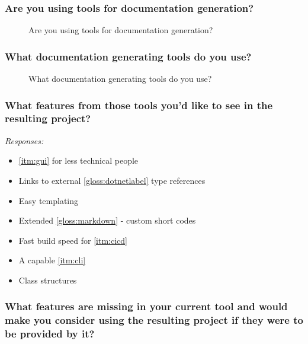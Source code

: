 \subsubsection*{Are you using tools for documentation generation?}

\begin{figure}[H]
    \centering
    \caption{Are you using tools for documentation generation?}
    \label{fig:qUsingToolsForDocGen}
\end{figure}

\subsubsection*{What documentation generating tools do you use?}

\begin{figure}[H]
    \centering
    \caption{What documentation generating tools do you use?}
\end{figure}

\subsubsection*{What features from those tools you'd like to see in the resulting project?}

\textit{Responses:}
\begin{itemize}
    \item \ref{itm:gui} for less technical people
    \item Links to external \ref{gloss:dotnetlabel} type references
    \item Easy templating
    \item Extended \ref{gloss:markdown} - custom short codes
    \item Fast build speed for \ref{itm:cicd}
    \item A capable \ref{itm:cli}
    \item Class structures
\end{itemize}

\subsubsection*{What features are missing in your current tool and would make you consider using the resulting project if they were to be provided by it?}

